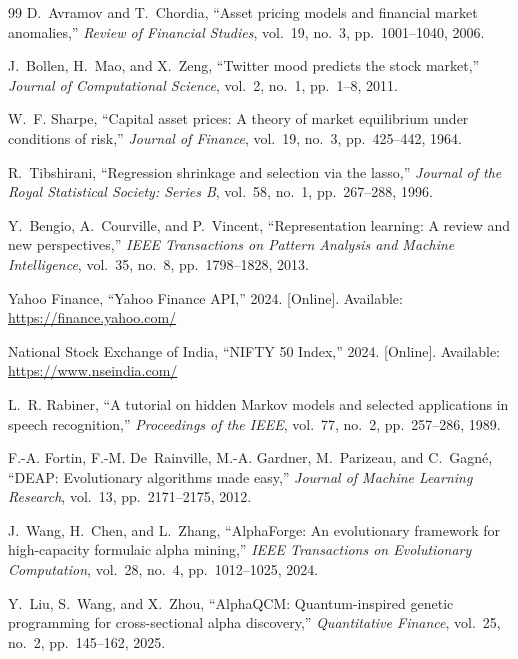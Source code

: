 \documentclass{ieeeaccess}
\begin{document}
\begin{thebibliography}{99}
D.~Avramov and T.~Chordia, ``Asset pricing models and financial market anomalies,'' \textit{Review of Financial Studies}, vol.~19, no.~3, pp.~1001--1040, 2006.

J.~Bollen, H.~Mao, and X.~Zeng, ``Twitter mood predicts the stock market,'' \textit{Journal of Computational Science}, vol.~2, no.~1, pp.~1--8, 2011.

W.~F. Sharpe, ``Capital asset prices: A theory of market equilibrium under conditions of risk,'' \textit{Journal of Finance}, vol.~19, no.~3, pp.~425--442, 1964.

R.~Tibshirani, ``Regression shrinkage and selection via the lasso,'' \textit{Journal of the Royal Statistical Society: Series B}, vol.~58, no.~1, pp.~267--288, 1996.

Y.~Bengio, A.~Courville, and P.~Vincent, ``Representation learning: A review and new perspectives,'' \textit{IEEE Transactions on Pattern Analysis and Machine Intelligence}, vol.~35, no.~8, pp.~1798--1828, 2013.

Yahoo Finance, ``Yahoo Finance API,'' 2024. [Online]. Available: \url{https://finance.yahoo.com/}

National Stock Exchange of India, ``NIFTY 50 Index,'' 2024. [Online]. Available: \url{https://www.nseindia.com/}

L.~R. Rabiner, ``A tutorial on hidden Markov models and selected applications in speech recognition,'' \textit{Proceedings of the IEEE}, vol.~77, no.~2, pp.~257--286, 1989.

F.-A. Fortin, F.-M. De~Rainville, M.-A. Gardner, M.~Parizeau, and C.~Gagn{\'e}, ``DEAP: Evolutionary algorithms made easy,'' \textit{Journal of Machine Learning Research}, vol.~13, pp.~2171--2175, 2012.

J.~Wang, H.~Chen, and L.~Zhang, ``AlphaForge: An evolutionary framework for high-capacity formulaic alpha mining,'' \textit{IEEE Transactions on Evolutionary Computation}, vol.~28, no.~4, pp.~1012--1025, 2024.

Y.~Liu, S.~Wang, and X.~Zhou, ``AlphaQCM: Quantum-inspired genetic programming for cross-sectional alpha discovery,'' \textit{Quantitative Finance}, vol.~25, no.~2, pp.~145--162, 2025.

\end{thebibliography}

\EOD
\end{document}
